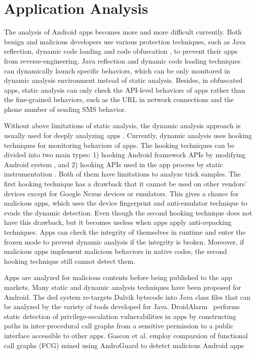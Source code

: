 \section{Application Analysis}

The analysis of Android apps becomes more and more difficult currently. Both benign and malicious developers use various protection techniques, such as Java reflection, dynamic code loading and code obfuscation \cite{rastogi2013droidchameleon}, to prevent their apps from reverse-engineering. Java reflection and dynamic code loading techniques can dynamically launch specific behaviors, which can be only monitored in dynamic analysis environment instead of static analysis. Besides, in obfuscated apps, static analysis can only check the API-level behaviors of apps rather than the fine-grained behaviors, such as the URL in network connections and the phone number of sending SMS behavior.

Without above limitations of static analysis, the dynamic analysis approach is usually used for deeply analyzing apps \cite{spreitzenbarth2013mobile}. Currently, dynamic analysis uses hooking techniques for monitoring behaviors of apps. The hooking techniques can be divided into two main types: 1) hooking Android framework APIs by modifying Android system \cite{zhauniarovich2015stadyna}\cite{enck2014taintdroid}, and 2) hooking APIs used in the app process by static instrumentation \cite{backes2013appguard}\cite{davis2013retroskeleton}. Both of them have limitations to analyze trick samples. The first hooking technique has a drawback that it cannot be used on other vendors' devices except for Google Nexus devices or emulators. This gives a chance for malicious apps, which uses the device fingerprint and anti-emulator technique to evade the dynamic detection. Even though the second hooking technique does not have this drawback, but it becomes useless when apps apply anti-repacking techniques. Apps can check the integrity of themselves in runtime and enter the frozen mode to prevent dynamic analysis if the integrity is broken. Moreover, if malicious apps implement malicious behaviors in native codes, the second hooking technique still cannot detect them.

Apps are analyzed for malicious contents before being published to the app markets. Many static and dynamic analysis techniques have been proposed for Android. The ded system re-targets Dalvik bytecode into Java class files that can be analyzed by the variety of tools developed for Java. %
DroidAlarm~\cite{Zhongyang-ASIACCS-2013} performs static detection of privilege-escalation vulnerabilities in apps by constructing paths in inter-procedural call graphs from a sensitive permission to a public interface accessible to other apps. Gascon et al. employ comparsion of functional call graphs (FCG) mined using AndroGuard to detetct malicious Android apps~\cite{Gascon-AISEC-2013}

